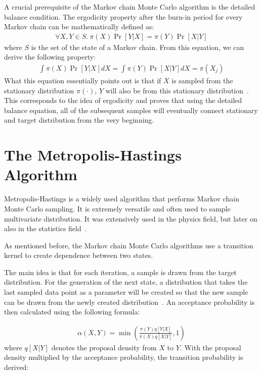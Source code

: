 A crucial prerequisite of the Markov chain Monte Carlo algorithm is the detailed balance condition. The ergodicity property after the burn-in period for every Markov chain can be mathematically defined as:
\begin{align}
\forall X, Y\in S. \ \pi(X) \Pr[Y|X] = \pi(Y) \Pr[X|Y]
\end{align}
\cite{mcmc_practice} where $S$ is the set of the state of a Markov chain. From this equation, we can derive the following property:
\begin{align}
\int \pi(X) \Pr[Y|X] dX= \int \pi(Y) \Pr[X|Y] dX =\pi(X_j)
\end{align}
What this equation essentially points out is that if $X$ is sampled from the stationary distribution $\pi(\cdot)$, $Y$ will also be from this stationary distribution~\cite{mcmc_practice}. This corresponds to the idea of ergodicity and proves that using the detailed balance equation, all of the subsequent samples will eventually connect stationary and target distribution from the very beginning.

\section{The Metropolis-Hastings Algorithm}
Metropolis-Hastings is a widely used algorithm that performs Markov chain Monte Carlo sampling. It is extremely versatile and often used to sample multivariate distribution. It was extensively used in the physics field, but later on also in the statistics field~\cite{understanding_mh}.

As mentioned before, the Markov chain Monte Carlo algorithms use a transition kernel to create dependence between two states.

The main idea is that for each iteration, a sample is drawn from the target distribution. For the generation of the next state, a distribution that takes the last sampled data point as a parameter will be created so that the new sample can be drawn from the newly created distribution~\cite{mcmc_practice}. An acceptance probability is then calculated using the following formula:

\begin{align}
\alpha(X, Y) = \min (\frac{\pi(Y)q[Y|X]}{\pi(X)q[X|Y]}, 1)
\end{align}
where $q[X|Y]$ denotes the proposal density from $X$ to $Y$. With the proposal density multiplied by the acceptance probability, the transition probability is derived:

